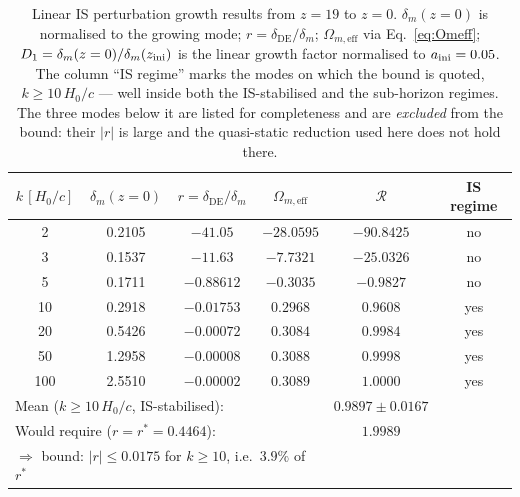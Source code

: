 \documentclass[12pt,a4paper]{article}
\begin{document}
\begin{table}[h!]
\centering
\caption{Linear IS perturbation growth results from $z=19$ to $z=0$.
  $\delta_m(z=0)$ is normalised to the growing mode; $r = \delta_{\mathrm{DE}}/\delta_m$;
  $\Omega_{m,\mathrm{eff}}$ via Eq.~\eqref{eq:Omeff}; $D_1 = \delta_m(z=0)/\delta_m(z_{\rm ini})$
  is the linear growth factor normalised to $a_{\rm ini} = 0.05$.
  The column ``IS regime'' marks the modes on which the bound is quoted,
  $k \geq 10\,H_0/c$ --- well inside both the IS-stabilised and the sub-horizon
  regimes. The three modes below it are listed for completeness and are
  \emph{excluded} from the bound: their $|r|$ is large and the quasi-static
  reduction used here does not hold there.}
\label{tab:MIRA}
\begin{tabular}{cccccc}
\toprule
$k\,[H_0/c]$ & $\delta_m(z=0)$ & $r = \delta_{\mathrm{DE}}/\delta_m$
  & $\Omega_{m,\mathrm{eff}}$ & $\mathcal{R}$ & IS regime \\
\midrule
2   & 0.2105 & $-41.05$   & $-28.0595$ & $-90.8425$ & no  \\
3   & 0.1537 & $-11.63$   & $-7.7321$  & $-25.0326$ & no  \\
5   & 0.1711 & $-0.88612$ & $-0.3035$  & $-0.9827$  & no  \\
10  & 0.2918 & $-0.01753$ & $0.2968$   & $0.9608$   & yes \\
20  & 0.5426 & $-0.00072$ & $0.3084$   & $0.9984$   & yes \\
50  & 1.2958 & $-0.00008$ & $0.3088$   & $0.9998$   & yes \\
100 & 2.5510 & $-0.00002$ & $0.3089$   & $1.0000$   & yes \\
\midrule
\multicolumn{4}{l}{Mean ($k \geq 10\,H_0/c$, IS-stabilised):}
  & $0.9897 \pm 0.0167$ & \\
\multicolumn{4}{l}{Would require ($r = r^* = 0.4464$):}
  & $1.9989$ & \\
\multicolumn{4}{l}{$\Rightarrow$ bound: $|r| \leq 0.0175$ for $k\geq10$, i.e.\ $3.9\%$ of $r^*$}
  &  & \\
\bottomrule
\end{tabular}
\end{table}
\end{document}
